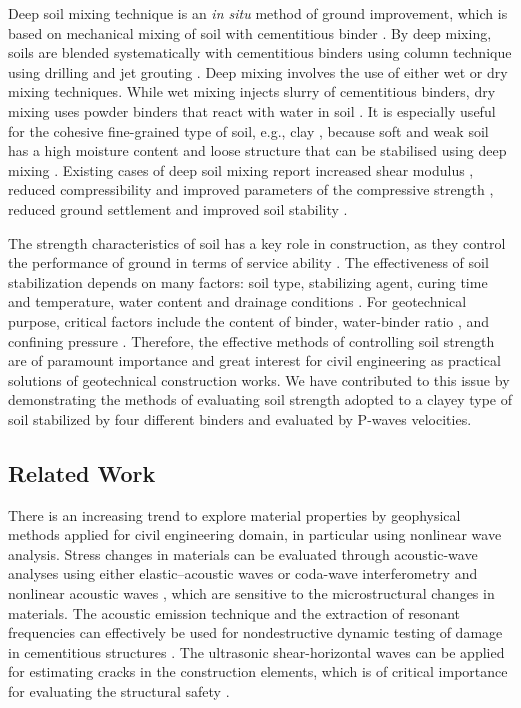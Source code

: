 \documentclass[USenglish,twocolumn]{article}
\begin{document}
Deep soil mixing technique is an \emph{in situ} method of ground improvement, which is based on mechanical mixing of soil with cementitious binder \cite{Kitazume,PorbahaetalA}. By deep mixing, soils are blended systematically with cementitious binders using column technique using drilling and jet grouting \cite{Larssonetal2015,Larsson}. Deep mixing involves the use of either wet or dry mixing techniques. While wet mixing injects slurry of cementitious binders, dry mixing uses powder binders that react with water in soil \cite{PorbahaetalB}. It is especially useful for the cohesive fine-grained type of soil, e.g., clay \cite{Dahlstroem,Xieetal2012}, because soft and weak soil has a high moisture content and loose structure that can be stabilised using deep mixing \cite{PorbahaetalC}. Existing cases of deep soil mixing report increased shear modulus \cite{Fangetal2001}, reduced compressibility and improved parameters of the compressive strength \cite{Mypati}, reduced ground settlement and improved soil stability \cite{Bergado}.

The strength characteristics of soil has a key role in construction, as they control the performance of ground in terms of service ability \cite{Munfakh}. The effectiveness of soil stabilization depends on many factors: soil type, stabilizing agent, curing time and temperature, water content and drainage conditions \cite{Winterkorn1991b}. For geotechnical purpose, critical factors include the content of binder, water-binder ratio \cite{Robertson,Zhang,Yangetal2010}, and confining pressure \cite{Rabbi,Xuetal2022,Huangetal2022}. Therefore, the effective methods of controlling soil strength are of paramount importance and great interest for civil engineering as practical solutions of geotechnical construction works. We have contributed to this issue by demonstrating the methods of evaluating soil strength adopted to a clayey type of soil stabilized by four different binders and evaluated by P-waves velocities.

\subsection{Related Work} 

There is an increasing trend to explore material properties by geophysical methods applied for civil engineering domain, in particular using nonlinear wave analysis. Stress changes in materials can be evaluated through acoustic-wave analyses using either elastic–acoustic waves \cite{Jiangetal2017} or coda-wave interferometry and nonlinear acoustic waves \cite{Jiangetal2021}, which are sensitive to the microstructural changes in materials. The acoustic emission technique and the extraction of resonant frequencies can effectively be used for nondestructive dynamic testing of damage in cementitious structures \cite{Lacidogna}. The ultrasonic shear-horizontal waves can be applied for estimating cracks in the construction elements, which is of critical importance for evaluating the structural safety \cite{LinWang}.
\end{document}
